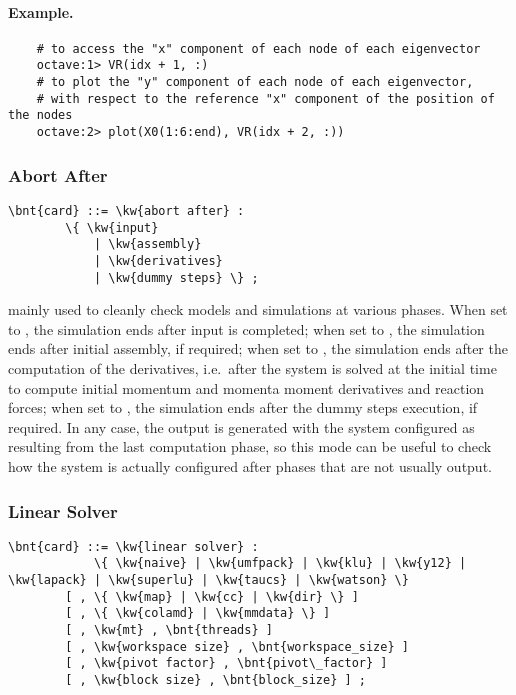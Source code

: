 \paragraph{Example.}
\begin{verbatim}
    # to access the "x" component of each node of each eigenvector
    octave:1> VR(idx + 1, :)
    # to plot the "y" component of each node of each eigenvector,
    # with respect to the reference "x" component of the position of the nodes
    octave:2> plot(X0(1:6:end), VR(idx + 2, :))
\end{verbatim}



\subsubsection{Abort After}
\label{sec:IVP:abort after}
\begin{Verbatim}[commandchars=\\\{\}]
    \bnt{card} ::= \kw{abort after} :
        \{ \kw{input} 
            | \kw{assembly}
            | \kw{derivatives}
            | \kw{dummy steps} \} ;
\end{Verbatim}
mainly used to cleanly check models and simulations at various phases.
When set to , the simulation ends after input is completed;
when set to , the simulation ends after initial assembly,
if required;
when set to , the simulation ends after the computation
of the derivatives, i.e.\ after the system is solved at the initial
time to compute initial momentum and momenta moment derivatives and 
reaction forces;
when set to , the simulation ends after the dummy steps
execution, if required.
In any case, the output is generated with the system configured 
as resulting from the last computation phase, so this mode can be useful 
to check how the system is actually configured after phases that are not 
usually output.


\subsubsection{Linear Solver}   
\label{sec:LINEAR-SOLVER}
\begin{Verbatim}[commandchars=\\\{\}]
    \bnt{card} ::= \kw{linear solver} :
            \{ \kw{naive} | \kw{umfpack} | \kw{klu} | \kw{y12} | \kw{lapack} | \kw{superlu} | \kw{taucs} | \kw{watson} \}
        [ , \{ \kw{map} | \kw{cc} | \kw{dir} \} ]
        [ , \{ \kw{colamd} | \kw{mmdata} \} ]
        [ , \kw{mt} , \bnt{threads} ]
        [ , \kw{workspace size} , \bnt{workspace_size} ] 
        [ , \kw{pivot factor} , \bnt{pivot\_factor} ]
        [ , \kw{block size} , \bnt{block_size} ] ;
\end{Verbatim}

